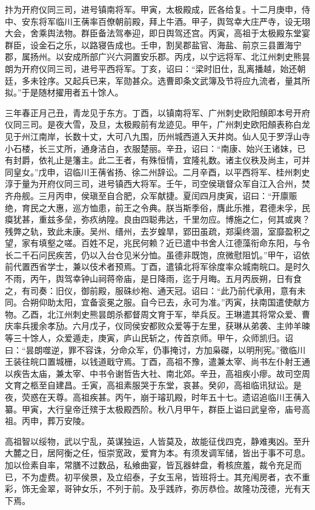 \documentclass[]{article}
\begin{document}
抃为开府仪同三司，进号镇南将军。甲寅，太极殿成，匠各给复。十二月庚申，侍中、安东将军临川王蒨率百僚朝前殿，拜上牛酒。甲子，舆驾幸大庄严寺，设无珝大会，舍乘舆法物。群臣备法驾奉迎，即日舆驾还宫。丙寅，高祖于太极殿东堂宴群臣，设金石之乐，以路寝告成也。壬申，割吴郡盐官、海盐、前京三县置海宁郡，属扬州。以安成所部广兴六洞置安乐郡。丙戌，以宁远将军、北江州刺史熊昙朗为开府仪同三司，进号平西将军。丁亥，诏曰：``梁时旧仕，乱离播越，始还朝廷，多未铨序。又起兵已来，军勋甚众。选曹即条文武簿及节将应九流者，量其所拟。''于是随材擢用者五十馀人。

三年春正月己丑，青龙见于东方。丁酉，以镇南将军、广州刺史欧阳頠即本号开府仪同三司。是夜大雪，及旦，太极殿前有龙迹见。甲午，广州刺史欧阳頠表称白龙见于州江南岸，长数十丈，大可八九围，历州城西道入天井岗。仙人见于罗浮山寺小石楼，长三丈所，通身洁白，衣服楚丽。辛丑，诏曰：``南康、始兴王诸妹，已有封爵，依礼止是籓主。此二王者，有殊恒情，宜隆礼数。诸主仪秩及尚主，可并同皇女。''戊申，诏临川王蒨省扬、徐二州辞讼。二月辛酉，以平西将军、桂州刺史淳于量为开府仪同三司，进号镇西大将军。壬午，司空侯瑱督众军自江入合州，焚齐舟舰。三月丙申，侯瑱至自合肥，众军献捷。夏闰四月庚寅，诏曰：``开廪赈绝，育民之大惠，巡方恤患，前王之令典。朕当斯季俗，膺此乐推，君德未孚，民瘼犹甚，重兹多垒，弥疚纳隍。良由四聪弗达，千里勿应。博施之仁，何其或爽？残弊之轨，致此未康。吴州、缙州，去岁蝗旱，郢田虽疏，郑渠终涸，室靡盈积之望，家有填壑之嗟。百姓不足，兆民何赖？近已遣中书舍人江德藻衔命东阳，与令长二千石问民疾苦，仍以入台仓见米分恤。虽德非既饱，庶微慰阻饥。''甲午，诏依前代置西省学士，兼以伎术者预焉。丁酉，遣镇北将军徐度率众城南皖口。是时久不雨，丙午，舆驾幸钟山祠蒋帝庙，是日降雨，迄于月晦。五月丙辰朔，日有食之，有司奏：旧仪，御前殿，服硃纱袍、通天冠。诏曰：``此乃前代承用，意有未同。合朔仰助太阳，宜备衮冕之服。自今已去，永可为准。''丙寅，扶南国遣使献方物。乙酉，北江州刺史熊昙朗杀都督周文育于军，举兵反。王琳遣其将常众爱、曹庆率兵援余孝劢。六月戊子，仪同侯安都败众爱等于左里，获琳从弟袭、主帅羊暕等三十馀人，众爱遁走，庚寅，庐山民斩之，传首京师。甲午，众师凯归。诏曰：``昙朗噬逆，罪不容诛，分命众军，仍事掩讨，方加枭磔，以明刑宪。''徵临川王装往皖口置城栅，以钱道戢守焉。丁酉，高祖不豫，遣兼太宰、尚书左仆射王通以疾告太庙，兼太宰、中书令谢哲告大社、南北郊。辛丑，高祖疾小瘳。故司空周文育之柩至自建昌。壬寅，高祖素服哭于东堂，哀甚。癸卯，高祖临讯狱讼。是夜，荧惑在天尊。高祖疾甚。丙午，崩于璿玑殿，时年五十七。遗诏追临川王蒨入纂。甲寅，大行皇帝迁殡于太极殿西阶。秋八月甲午，群臣上谥曰武皇帝，庙号高祖。丙申，葬万安陵。

高祖智以绥物，武以宁乱，英谋独运，人皆莫及，故能征伐四克，静难夷凶。至升大麓之日，居阿衡之任，恒崇宽政，爱育为本。有须发调军储，皆出于事不可息。加以俭素自率，常膳不过数品，私飨曲宴，皆瓦器蚌盘，肴核庶羞，裁令充足而已，不为虚费。初平侯景，及立绍泰，子女玉帛，皆班将士。其充闱房者，衣不重彩，饰无金翠，哥钟女乐，不列于前。及乎践祚，弥厉恭俭。故隆功茂德，光有天下焉。
\end{document}
